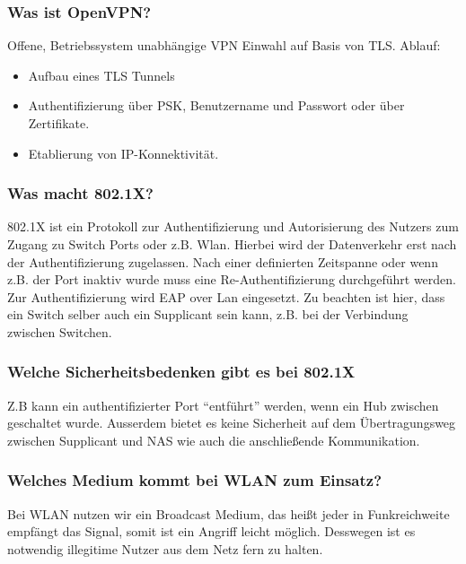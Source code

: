 		\subsubsection{Was ist OpenVPN?}
		Offene, Betriebssystem unabhängige VPN Einwahl auf Basis von TLS.
		Ablauf:
		\begin{itemize}
			\item Aufbau eines TLS Tunnels
			\item Authentifizierung über PSK, Benutzername und Passwort oder über Zertifikate.
			\item Etablierung von IP-Konnektivität.
		\end{itemize}
		
		\subsubsection{Was macht 802.1X?}
		802.1X ist ein Protokoll zur Authentifizierung und Autorisierung des Nutzers  zum Zugang zu Switch Ports oder z.B. Wlan. Hierbei wird der Datenverkehr erst nach der Authentifizierung zugelassen. Nach einer definierten Zeitspanne oder wenn z.B. der Port inaktiv wurde muss eine Re-Authentifizierung durchgeführt werden. Zur Authentifizierung wird EAP over Lan eingesetzt. Zu beachten ist hier, dass ein Switch selber auch ein Supplicant sein kann, z.B. bei der Verbindung zwischen Switchen.
		
		\subsubsection{Welche Sicherheitsbedenken gibt es bei 802.1X}
		Z.B kann ein authentifizierter Port "`entführt"' werden, wenn ein Hub zwischen geschaltet wurde. Ausserdem bietet es keine Sicherheit auf dem Übertragungsweg zwischen Supplicant und NAS wie auch die anschließende Kommunikation. 
		
		\subsubsection{Welches Medium kommt bei WLAN zum Einsatz?}
		Bei WLAN nutzen wir ein Broadcast Medium, das heißt jeder in Funkreichweite empfängt das Signal, somit ist ein Angriff leicht möglich. Desswegen ist es notwendig illegitime Nutzer aus dem Netz fern zu halten.
		
